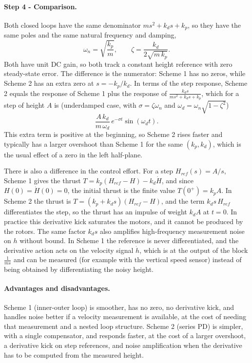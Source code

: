 \paragraph{Step 4 - Comparison.}
Both closed loops have the same denominator $m s^2 + k_d s + k_p$, so they have the same poles and the same natural frequency and damping,
\begin{equation*}
\omega_n = \sqrt{\frac{k_p}{m}}, \qquad \zeta = \frac{k_d}{2\sqrt{m\,k_p}} .
\end{equation*}
Both have unit DC gain, so both track a constant height reference with zero steady-state error.
The difference is the numerator: Scheme 1 has no zeros, while Scheme 2 has an extra zero at $s = -k_p/k_d$.
In terms of the step response, Scheme 2 equals the response of Scheme 1 plus the response of $\frac{k_d s}{m s^2 + k_d s + k_p}$, which for a step of height $A$ is (underdamped case, with $\sigma = \zeta\omega_n$ and $\omega_d = \omega_n\sqrt{1-\zeta^2}$)
\begin{equation*}
\frac{A\, k_d}{m\,\omega_d}\, e^{-\sigma t} \sin(\omega_d t) .
\end{equation*}
This extra term is positive at the beginning, so Scheme 2 rises faster and typically has a larger overshoot than Scheme 1 for the same $(k_p, k_d)$, which is the usual effect of a zero in the left half-plane.

There is also a difference in the control effort.
For a step $H_{ref}(s) = A/s$, Scheme 1 gives the thrust $T = k_p(H_{ref} - H) - k_d \dot H$, and since $H(0) = \dot H(0) = 0$, the initial thrust is the finite value $T(0^+) = k_p A$.
In Scheme 2 the thrust is $T = (k_p + k_d s)(H_{ref} - H)$, and the term $k_d s\, H_{ref}$ differentiates the step, so the thrust has an impulse of weight $k_d A$ at $t = 0$.
In practice this derivative kick saturates the motors, and it cannot be produced by the rotors.
The same factor $k_d s$ also amplifies high-frequency measurement noise on $h$ without bound.
In Scheme 1 the reference is never differentiated, and the derivative action acts on the velocity signal $\dot h$, which is at the output of the block $\frac{1}{ms}$ and can be measured (for example with the vertical speed sensor) instead of being obtained by differentiating the noisy height.

\paragraph{Advantages and disadvantages.}
Scheme 1 (inner-outer loop) is smoother, has no zero, no derivative kick, and handles noise better if a velocity measurement is available, at the cost of needing that measurement and a nested loop structure.
Scheme 2 (series PD) is simpler, with a single compensator, and responds faster, at the cost of a larger overshoot, a derivative kick on step references, and noise amplification when the derivative has to be computed from the measured height.

